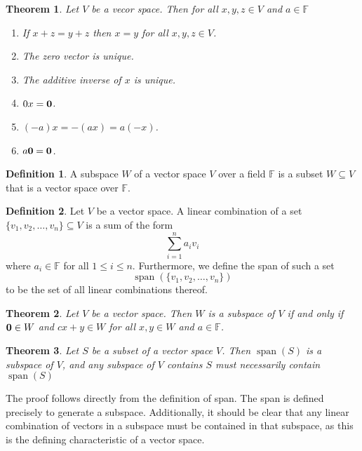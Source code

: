 \documentclass[oneside, 12pt]{book}
\DeclareMathOperator{\spn}{span}
\newtheorem{thm}{Theorem}[section]
\theoremstyle{definition}
\newtheorem{defn}{Definition}[section]
\begin{document}
\begin{thm}
\label{thm_alg}
Let $V$ be a vecor space. Then for all $x,y,z \in V$ and $a \in \mathbb{F}$
\begin{enumerate}[label=(\roman*)]
  \item If $x+z=y+z$ then $x=y$ for all $x,y,z \in V$.
  \item The zero vector is unique.
  \item The additive inverse of $x$ is unique.
  \item $0x=\bold{0}$.
  \item $(-a)x=-(ax)=a(-x)$.
  \item $a\bold{0}=\bold{0}$.
\end{enumerate}
\end{thm}

\begin{defn}
\label{defn_subspace}
A subspace $W$ of a vector space $V$ over a field $\mathbb{F}$ is a subset $W \subseteq V$ that is a vector space over $\mathbb{F}$.
\end{defn}
\begin{defn}
  \label{defn_lincom}
  Let $V$ be a vector space. A linear combination of a set $\{v_{1}, v_{2}, \dots, v_{n}\} \subseteq V$ is a sum of the form
  \[\sum_{i=1}^{n}a_{i}v_{i}\] where $a_{i} \in \mathbb{F}$ for all $1 \leq i \leq n$. Furthermore, we define the span of such a set \[\spn(\{v_{1}, v_{2}, \dots, v_{n}\})\] to be the set of all linear combinations thereof.
\end{defn}
\begin{thm}
\label{thm_subspace}
  Let $V$ be a vector space. Then $W$ is a subspace of $V$ if and only if $\bold{0} \in W$ and $cx+y \in W$ for all $x,y \in W$ and $a \in \mathbb{F}$.
\end{thm}
\begin{thm}
\label{thm_spn}
Let $S$ be a subset of a vector space $V$. Then $\spn(S)$ is a subspace of $V$, and any subspace of $V$ contains $S$ must necessarily contain $\spn(S)$
\end{thm}
The proof follows directly from the definition of span. The span is defined precisely to generate a subspace. Additionally, it should be clear that any linear combination of vectors in a subspace must be contained in that subspace, as this is the defining characteristic of a vector space.
\end{document}
